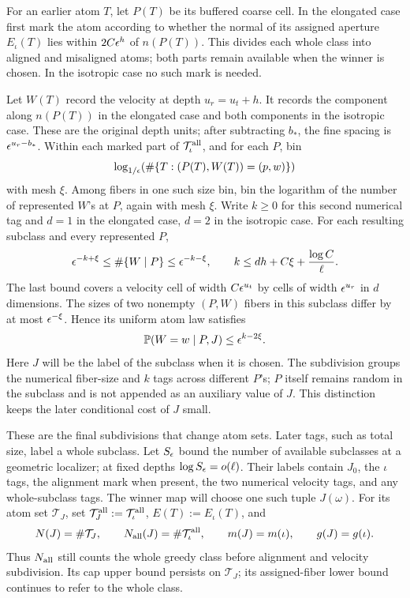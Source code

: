For an earlier atom \(T\), let \(P(T)\) be its buffered coarse cell.
In the elongated case first mark the atom according to whether the
normal of its assigned aperture \(E_\iota(T)\) lies within
\(2C\epsilon^h\) of \(n(P(T))\).  This divides each whole class into
aligned and misaligned atoms; both parts remain available when the
winner is chosen.  In the isotropic case no such mark is needed.

Let \(W(T)\) record the velocity at depth \(u_r=u_t+h\).  It records
the component along \(n(P(T))\) in the elongated case and both
components in the isotropic case.  These are the original depth
units; after subtracting \(b_*\), the fine spacing is
\(\epsilon^{u_r-b_*}\).  Within each marked part of
\(\mathcal T_\iota^{\rm all}\), and for each \(P\), bin
\[
 \log_{1/\epsilon}\!\left(\#\{T:(P(T),W(T))=(p,w)\}\right)
\]
with mesh \(\xi\).  Among fibers in one such size bin, bin the
logarithm of the number of represented \(W\)'s at \(P\), again with
mesh \(\xi\).  Write \(k\ge0\) for this second numerical tag and
\(d=1\) in the elongated case, \(d=2\) in the isotropic case.
For each resulting subclass and every represented \(P\),
\begin{equation}
 \epsilon^{-k+\xi}\leq \#\{W\mid P\}\leq\epsilon^{-k-\xi},
 \qquad k\leq dh+C\xi+\frac{\log C}{\ell}.
 \label{eq:velocity-fiber-regularity}
\end{equation}
The last bound covers a velocity cell of width \(C\epsilon^{u_t}\)
by cells of width \(\epsilon^{u_r}\) in \(d\) dimensions.
The sizes of two nonempty \((P,W)\) fibers in this subclass differ
by at most \(\epsilon^{-\xi}\).  Hence its uniform atom law satisfies
\begin{equation}
 \mathbb P(W=w\mid P,J)\leq\epsilon^{k-2\xi}.
 \label{eq:prepared-velocity-probability}
\end{equation}
Here \(J\) will be the label of the subclass when it is chosen.
The subdivision groups the numerical fiber-size and \(k\) tags
across different \(P\)'s; \(P\) itself remains random in the
subclass and is not appended as an auxiliary value of \(J\).
This distinction keeps the later conditional cost of \(J\) small.

These are the final subdivisions that change atom sets.  Later tags,
such as total size, label a whole subclass.  Let \(S_\epsilon\) bound
the number of available subclasses at a geometric localizer; at
fixed depths \(\log S_\epsilon=o(\ell)\).  Their labels contain \(J_0\),
the \(\iota\) tags, the alignment mark when present, the two
numerical velocity tags, and any whole-subclass tags.  The winner map will choose one
such tuple \(J(\omega)\).  For its atom set \(\mathcal T_J\), set
\(\mathcal T_J^{\rm all}:=\mathcal T_\iota^{\rm all}\),
\(E(T):=E_\iota(T)\), and
\[
 N(J)=\#\mathcal T_J,\qquad
 N_{\rm all}(J)=\#\mathcal T_\iota^{\rm all},\qquad
 m(J)=m(\iota),\qquad g(J)=g(\iota).
\]
Thus \(N_{\rm all}\) still counts the whole greedy class before
alignment and velocity subdivision.  Its cap upper bound persists
on \(\mathcal T_J\); its assigned-fiber lower bound continues to
refer to the whole class.


